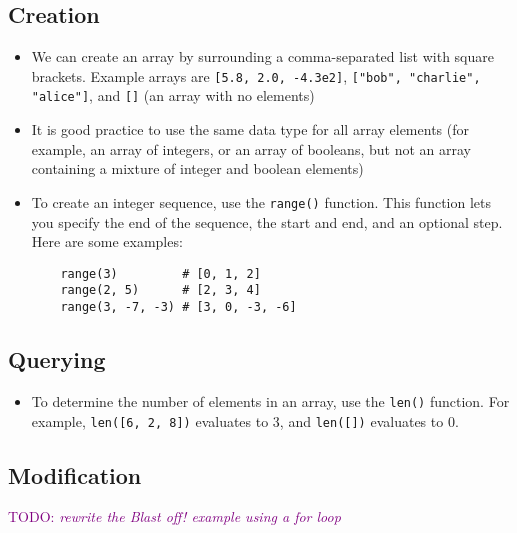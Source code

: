 \documentclass[a4paper,twoside]{memoir}
\makeatletter
\newcommand{\FrameTitle}[2]{%
  \fboxrule=\FrameRule \fboxsep=\FrameSep
  \fbox{\vbox{\nobreak \vskip -0.7\FrameSep
    \rlap{\centerline{\strut#1}}\nobreak\nointerlineskip%
    \vskip 0.7\FrameSep
    \hbox{#2}}}}
\newenvironment{framewithtitle}[2][\FrameFirst@Lab\ (cont.)]{%
  \def\FrameFirst@Lab{\textbf{#2}}%
  \def\FrameCont@Lab{\textbf{#1}}%
  \def\FrameCommand##1{%
    \FrameTitle{\FrameFirst@Lab}{##1}}%
  \def\FirstFrameCommand##1{%
    \FrameTitle{\FrameFirst@Lab}{##1}}%
  \def\MidFrameCommand##1{%
    \FrameTitle{\FrameCont@Lab}{##1}}%
  \def\LastFrameCommand##1{%
    \FrameTitle{\FrameCont@Lab}{##1}}%
\MakeFramed{\advance\hsize-\width \FrameRestore}}%
{\endMakeFramed}
\newcounter{exercisectr}
\newenvironment{exercise}
{\stepcounter{exercisectr}\begin{framewithtitle}{Practical \arabic{exercisectr}}}
{\end{framewithtitle}}
\newcommand{\shellcmd}{\texttt}
\newcommand{\TODO}[1]{\textcolor{purple}{TODO: \emph{#1}}}
\makeatother
\begin{document}
\subsection{Creation}
\begin{itemize}
\item We can create an array by surrounding a comma-separated list with square brackets.  Example arrays are \shellcmd{[5.8, 2.0, -4.3e2]}, \shellcmd{["bob", "charlie", "alice"]}, and \shellcmd{[]} (an array with no elements)
\item It is good practice to use the same data type for all array elements (for example, an array of integers, or an array of booleans, but not an array containing a mixture of integer and boolean elements)
\item To create an integer sequence, use the \shellcmd{range()} function.  This function lets you specify the end of the sequence, the start and end, and an optional step.  Here are some examples:
\begin{verbatim}
	range(3)         # [0, 1, 2]
	range(2, 5)      # [2, 3, 4]
	range(3, -7, -3) # [3, 0, -3, -6]
\end{verbatim}
\end{itemize}

\subsection{Querying}
\begin{itemize}
\item To determine the number of elements in an array, use the \shellcmd{len()} function.  For example, \shellcmd{len([6, 2, 8])} evaluates to 3, and \shellcmd{len([])} evaluates to 0.
\end{itemize}

\subsection{Modification}

\begin{exercise}
\TODO{rewrite the Blast off! example using a for loop}
\end{exercise}

\end{document}

